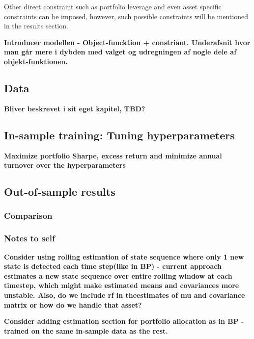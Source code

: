 Other direct constraint such as portfolio leverage and even asset specific constraints can be imposed, however, such possible constraints will be mentioned in the results section.

\textbf{Introducer modellen
- Object-funcktion + constriant.
Underafsnit hvor man går mere i dybden med valget og udregningen af nogle dele af objekt-funktionen.}

\subsection{Data}

\textbf{Bliver beskrevet i sit eget kapitel, TBD?}


\subsection{In-sample training: Tuning hyperparameters}

\textbf{Maximize portfolio Sharpe, excess return and minimize annual turnover over the hyperparameters}

\subsection{Out-of-sample results}


\subsubsection{Comparison}



\subsubsection{Notes to self}


\textbf{Consider using rolling estimation of state sequence where only 1 new state is detected each time step(like in BP) - current approach estimates a new state sequence over entire rolling window at each timestep, which might make estimated means and covariances more unstable. Also, do we include rf in theestimates of mu and covariance matrix or how do we handle that asset?}

\textbf{Consider adding estimation section for portfolio allocation as in BP - trained on the same in-sample data as the rest.}